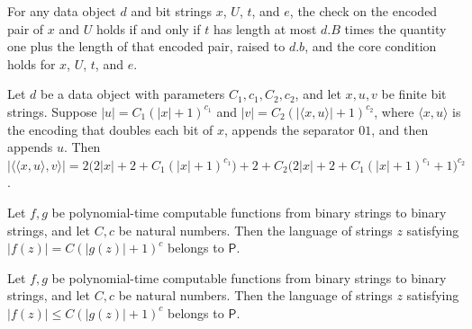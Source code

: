 \begin{theorem}
\label{Complexity.Yap.Data.check_pair}
\leanok
{}
For any data object $d$ and bit strings $x$, $U$, $t$, and $e$, the check on the encoded
pair of $x$ and $U$ holds if and only if $t$ has length at most $d.B$ times the quantity
one plus the length of that encoded pair, raised to $d.b$, and the core condition holds
for $x$, $U$, $t$, and $e$.
\end{theorem}

\begin{theorem}
\label{Complexity.Yap.Data.length_inst}
\leanok
{}
Let $d$ be a data object with parameters $C_1,c_1,C_2,c_2$, and let $x,u,v$ be finite
bit strings. Suppose $|u|=C_1(|x|+1)^{c_1}$ and $|v|=C_2(|\langle x,u\rangle|+1)^{c_2}$,
where $\langle x,u\rangle$ is the encoding that doubles each bit of $x$, appends the
separator $01$, and then appends $u$. Then $|\langle\langle
x,u\rangle,v\rangle|=2\bigl(2|x|+2+C_1(|x|+1)^{c_1}\bigr)+2+C_2\bigl(2|x|+2+C_1(|x|+1)^{c_1}+1\bigr)^{c_2}$.
\end{theorem}

\begin{theorem}
\label{Complexity.Yap.lenEq_poly_mem_P}
\leanok
{}
Let $f,g$ be polynomial-time computable functions from binary strings to binary strings,
and let $C,c$ be natural numbers. Then the language of strings $z$ satisfying
$|f(z)|=C(|g(z)|+1)^c$ belongs to $\mathsf P$.
\end{theorem}

\begin{theorem}
\label{Complexity.Yap.lenLe_poly_mem_P}
\leanok
{}
Let $f,g$ be polynomial-time computable functions from binary strings to binary strings,
and let $C,c$ be natural numbers. Then the language of strings $z$ satisfying $|f(z)|\le
C(|g(z)|+1)^c$ belongs to $\mathsf P$.
\end{theorem}

